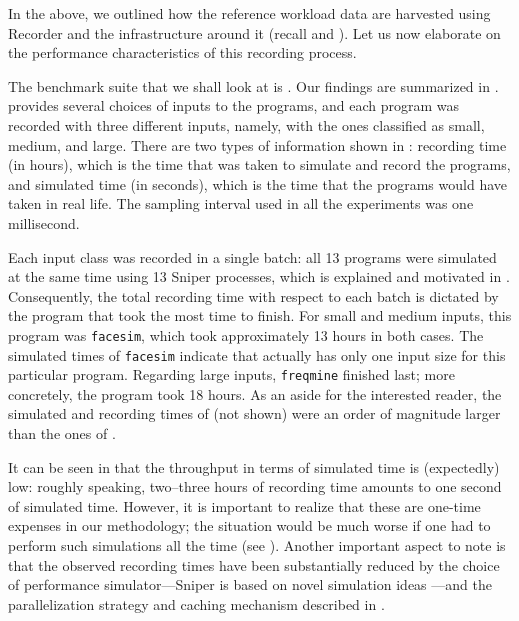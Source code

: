 
In the above, we outlined how the reference workload data are harvested using
Recorder and the infrastructure around it (recall  and
). Let us now elaborate on the performance characteristics of
this recording process.

The benchmark suite that we shall look at is . Our findings are
summarized in .  provides several choices of inputs
to the programs, and each program was recorded with three different inputs,
namely, with the ones classified as small, medium, and large. There are two
types of information shown in : recording time (in hours), which
is the time that was taken to simulate and record the programs, and simulated
time (in seconds), which is the time that the programs would have taken in real
life. The sampling interval used in all the experiments was one millisecond.

Each input class was recorded in a single batch: all 13 programs were simulated
at the same time using 13 Sniper processes, which is explained and motivated in
. Consequently, the total recording time with respect to each
batch is dictated by the program that took the most time to finish. For small
and medium inputs, this program was \texttt{facesim}, which took approximately
13 hours in both cases. The simulated times of \texttt{facesim} indicate that
 actually has only one input size for this particular program.
Regarding large inputs, \texttt{freqmine} finished last; more concretely, the
program took 18 hours. As an aside for the interested reader, the simulated and
recording times of  (not shown) were an order of magnitude
larger than the ones of .

It can be seen in  that the throughput in terms of simulated
time is (expectedly) low: roughly speaking, two--three hours of recording time
amounts to one second of simulated time. However, it is important to realize
that these are one-time expenses in our methodology; the situation would be much
worse if one had to perform such simulations all the time (see ).
Another important aspect to note is that the observed recording times have been
substantially reduced by the choice of performance simulator---Sniper is based
on novel simulation ideas \cite{carlson2011}---and the parallelization strategy
and caching mechanism described in .
